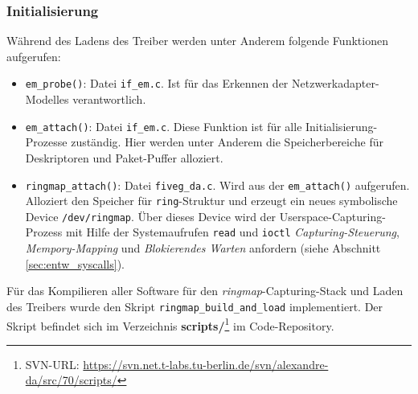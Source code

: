 \subsubsection*{Initialisierung}
Während des Ladens des Treiber werden unter Anderem folgende Funktionen aufgerufen: 
\begin{itemize}
	\item \verb+em_probe()+: Datei \verb+if_em.c+. Ist für das Erkennen der
		Netzwerkadapter-Modelles verantwortlich. 
	\item \verb+em_attach()+: Datei \verb+if_em.c+. Diese Funktion ist für alle
		Initialisierung-Prozesse zuständig. Hier werden unter Anderem die
		Speicherbereiche für Deskriptoren und Paket-Puffer alloziert.
	\item \verb+ringmap_attach()+: Datei \verb+fiveg_da.c+. Wird aus der
		\verb+em_attach()+ aufgerufen. Alloziert den Speicher für
		\verb+ring+-Struktur und erzeugt ein neues symbolische Device
		\verb+/dev/ringmap+. Über dieses Device  wird der
		Userspace-Capturing-Prozess mit Hilfe der Systemaufrufen \verb+read+
		und \verb+ioctl+ \emph{Capturing-Steuerung}, \emph{Mempory-Mapping} und
		\emph{Blokierendes Warten} anfordern (siehe Abschnitt
		\ref{sec:entw_syscalls}).
\end{itemize}
Für das Kompilieren aller Software für den \emph{ringmap}-Capturing-Stack und Laden des Treibers 
wurde den Skript \verb+ringmap_build_and_load+ implementiert. Der Skript befindet sich 
im Verzeichnis \textbf{scripts/}\footnote{SVN-URL:
\url{https://svn.net.t-labs.tu-berlin.de/svn/alexandre-da/src/70/scripts/}}
im Code-Repository.

